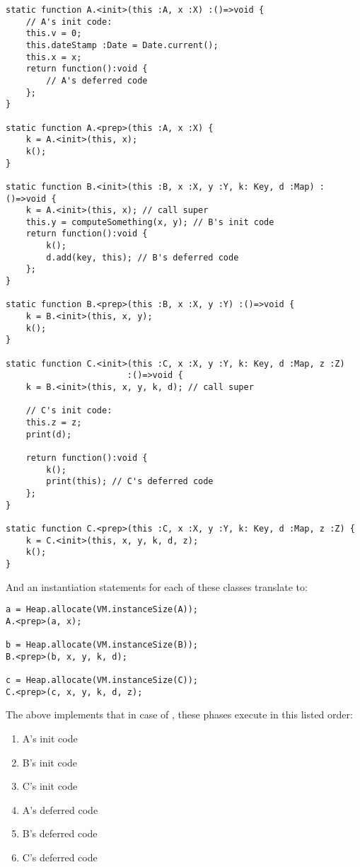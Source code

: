 \begin{lstlisting}
static function A.<init>(this :A, x :X) :()=>void {
    // A's init code:
    this.v = 0;
    this.dateStamp :Date = Date.current();
    this.x = x;
    return function():void {
        // A's deferred code
    };
}

static function A.<prep>(this :A, x :X) {
    k = A.<init>(this, x);
    k();
}

static function B.<init>(this :B, x :X, y :Y, k: Key, d :Map) :()=>void {
    k = A.<init>(this, x); // call super
    this.y = computeSomething(x, y); // B's init code
    return function():void {
        k();
        d.add(key, this); // B's deferred code
    };
}

static function B.<prep>(this :B, x :X, y :Y) :()=>void {
    k = B.<init>(this, x, y);
    k();
}

static function C.<init>(this :C, x :X, y :Y, k: Key, d :Map, z :Z)
                        :()=>void {
    k = B.<init>(this, x, y, k, d); // call super

    // C's init code:
    this.z = z;
    print(d);

    return function():void {
        k();
        print(this); // C's deferred code
    };
}

static function C.<prep>(this :C, x :X, y :Y, k: Key, d :Map, z :Z) {
    k = C.<init>(this, x, y, k, d, z);
    k();
}
\end{lstlisting}

And an instantiation statements for each of these classes translate to:

\begin{verbatim}
a = Heap.allocate(VM.instanceSize(A));
A.<prep>(a, x);

b = Heap.allocate(VM.instanceSize(B));
B.<prep>(b, x, y, k, d);

c = Heap.allocate(VM.instanceSize(C));
C.<prep>(c, x, y, k, d, z);
\end{verbatim}

The above implements that in case of , these phases execute in this
listed order:
\begin{enumerate}
  \item A's init code
  \item B's init code
  \item C's init code
  \item A's deferred code
  \item B's deferred code
  \item C's deferred code
\end{enumerate}

